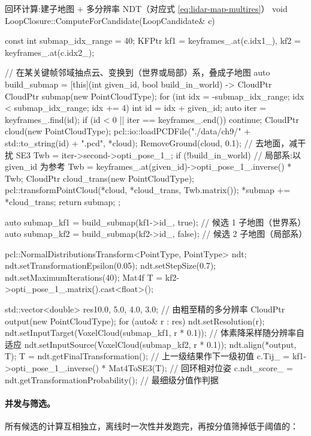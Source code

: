 \begin{codebox}[C++]{回环计算:建子地图 + 多分辨率 NDT（对应式 \ref{eq:lidar-map-multires}）}
void LoopClosure::ComputeForCandidate(LoopCandidate& c) {
  const int submap_idx_range = 40;
  KFPtr kf1 = keyframes_.at(c.idx1_), kf2 = keyframes_.at(c.idx2_);

  // 在某关键帧邻域抽点云、变换到（世界或局部）系，叠成子地图
  auto build_submap = [this](int given_id, bool build_in_world) -> CloudPtr {
    CloudPtr submap(new PointCloudType);
    for (int idx = -submap_idx_range; idx < submap_idx_range; idx += 4) {
      int id = idx + given_id;
      auto iter = keyframes_.find(id);
      if (id < 0 || iter == keyframes_.end()) continue;
      CloudPtr cloud(new PointCloudType);
      pcl::io::loadPCDFile("./data/ch9/" + std::to_string(id) + ".pcd", *cloud);
      RemoveGround(cloud, 0.1);                       // 去地面，减干扰
      SE3 Twb = iter->second->opti_pose_1_;
      if (!build_in_world)                            // 局部系:以 given_id 为参考
        Twb = keyframes_.at(given_id)->opti_pose_1_.inverse() * Twb;
      CloudPtr cloud_trans(new PointCloudType);
      pcl::transformPointCloud(*cloud, *cloud_trans, Twb.matrix());
      *submap += *cloud_trans;
    }
    return submap;
  };

  auto submap_kf1 = build_submap(kf1->id_, true);     // 候选 1 子地图（世界系）
  auto submap_kf2 = build_submap(kf2->id_, false);    // 候选 2 子地图（局部系）

  pcl::NormalDistributionsTransform<PointType, PointType> ndt;
  ndt.setTransformationEpsilon(0.05);
  ndt.setStepSize(0.7);
  ndt.setMaximumIterations(40);
  Mat4f T = kf2->opti_pose_1_.matrix().cast<float>();

  std::vector<double> res{10.0, 5.0, 4.0, 3.0};       // 由粗至精的多分辨率
  CloudPtr output(new PointCloudType);
  for (auto& r : res) {
    ndt.setResolution(r);
    ndt.setInputTarget(VoxelCloud(submap_kf1, r * 0.1)); // 体素降采样随分辨率自适应
    ndt.setInputSource(VoxelCloud(submap_kf2, r * 0.1));
    ndt.align(*output, T);
    T = ndt.getFinalTransformation();                 // 上一级结果作下一级初值
  }
  c.Tij_       = kf1->opti_pose_1_.inverse() * Mat4ToSE3(T); // 回环相对位姿
  c.ndt_score_ = ndt.getTransformationProbability();   // 最细级分值作判据
}
\end{codebox}

\paragraph{并发与筛选。}
所有候选的计算互相独立，离线时一次性并发跑完，再按分值筛掉低于阈值的：

